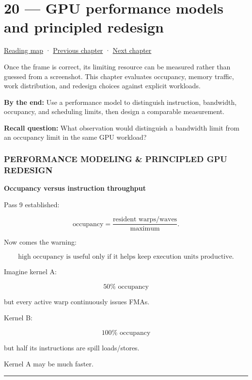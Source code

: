 \hypertarget{05-engine-i-ch020}{}
\section{20 --- GPU performance models and principled redesign}\label{gpu-performance-models-and-principled-redesign}

\href{Chapter\%20Edition/03\%20-\%20Game\%20Engine/00\%20-\%20Reading\%20Map}{Reading map} · \hyperref[05-engine-i-ch019]{Previous chapter} · \hyperref[05-engine-i-ch021]{Next chapter}

Once the frame is correct, its limiting resource can be measured rather than guessed from a screenshot. This chapter evaluates occupancy, memory traffic, work distribution, and redesign choices against explicit workloads.

\textbf{By the end:} Use a performance model to distinguish instruction, bandwidth, occupancy, and scheduling limits, then design a comparable measurement.

\textbf{Recall question:} What observation would distinguish a bandwidth limit from an occupancy limit in the same GPU workload?

\subsubsection{PERFORMANCE MODELING \& PRINCIPLED GPU REDESIGN}\label{performance-modeling-principled-gpu-redesign}

\textbf{Occupancy versus instruction throughput}

Pass 9 established:

\[
\text{occupancy}
=
\frac{
\text{resident warps/waves}
}{
\text{maximum}
}.
\]

Now comes the warning:

\[
\boxed{
\text{high occupancy is useful only if it helps keep execution units productive}.
}
\]

Imagine kernel A:

\[
50\%\text{ occupancy}
\]

but every active warp continuously issues FMAs.

Kernel B:

\[
100\%\text{ occupancy}
\]

but half its instructions are spill loads/stores.

Kernel A may be much faster.

\begin{center}\rule{0.5\linewidth}{0.5pt}\end{center}

